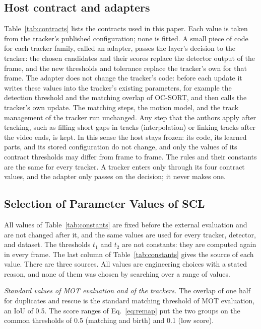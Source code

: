 \subsection{Host contract and adapters}\label{sec:contract}
Table~\ref{tab:contracts} lists the contracts used in this paper. Each value
is taken from the tracker's published configuration; none is fitted. A small
piece of code for each tracker family, called an adapter, passes the layer's
decision to the tracker:
the chosen candidates and their scores replace the detector output of the
frame, and the new thresholds and tolerance replace the tracker's own for
that frame. The adapter does not change the tracker's code: before each
update it writes these values into the tracker's existing parameters, for
example the detection threshold and the matching overlap of OC-SORT, and then
calls the tracker's own update. The matching steps, the motion model, and the
track management of the tracker run unchanged. Any step that the authors apply after tracking, such as
filling short gaps in tracks (interpolation) or linking tracks after the video
ends, is kept. In this sense the host stays frozen: its code, its learned
parts, and its stored configuration do not change, and only the values of its
contract thresholds may differ from frame to frame. The rules and their constants are
the same for every tracker. A tracker enters only through its four contract
values, and the adapter only passes on the decision; it never makes one.



\subsection{Selection of Parameter Values of SCL}\label{sec:constants}
All values of Table~\ref{tab:constants} are fixed before the external evaluation and are not
changed after it, and the same values are used for every tracker, detector, and dataset. The
thresholds $t_1$ and $t_2$ are not constants: they are computed again in every frame. The last
column of Table~\ref{tab:constants} gives the source of each value. There are three sources. All
values are engineering choices with a stated reason, and none of them was chosen by searching over
a range of values.

\emph{Standard values of MOT evaluation and of the trackers.} The overlap of one half for
duplicates and rescue is the standard matching threshold of MOT evaluation, an IoU of 0.5. The score
ranges of Eq.~\eqref{eq:remap} put the two groups on the common thresholds of 0.5 (matching and
birth) and 0.1 (low score).

